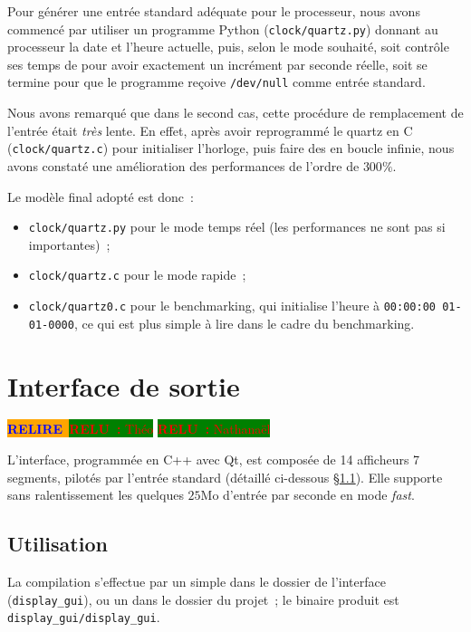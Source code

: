 \documentclass[11pt,a4paper]{article}
\newcommand{\relire}{\colorbox{orange}{\textcolor{blue}{\textbf{RELIRE}~}}}
\newcommand{\relu}[1]{\colorbox{green}{\textcolor{red}{\textbf{RELU~:} #1}}}
\begin{document}
Pour générer une entrée standard adéquate pour le processeur, nous avons commencé par utiliser un programme Python (\texttt{clock/quartz.py}) donnant au processeur la date et l'heure actuelle, puis, selon le mode souhaité, soit contrôle ses temps de  pour avoir exactement un incrément par seconde réelle, soit se termine pour que le programme reçoive \texttt{/dev/null} comme entrée standard.

Nous avons remarqué que dans le second cas, cette procédure de remplacement de l'entrée était \emph{très} lente. En effet, après avoir reprogrammé le quartz en C (\texttt{clock/quartz.c}) pour initialiser l'horloge, puis faire des  en boucle infinie, nous avons constaté une amélioration des performances de l'ordre de $300\%$.

Le modèle final adopté est donc~:
\begin{itemize}
\item \texttt{clock/quartz.py} pour le mode temps réel (les performances ne sont pas si importantes)~;
\item \texttt{clock/quartz.c} pour le mode rapide~;
\item \texttt{clock/quartz0.c} pour le benchmarking, qui initialise l'heure à \verb!00:00:00 01-01-0000!, ce qui est plus simple à lire dans le cadre du benchmarking.
\end{itemize}

\section{Interface de sortie} \label{sec:gui}

\relire \relu{Théo}
\relu{Nathanaël}

L'interface, programmée en C++ avec Qt, est composée de 14 afficheurs 7 segments, pilotés par l'entrée standard (détaillé ci-dessous §\ref{ssec:gui_use}). Elle supporte sans ralentissement les quelques $25\text{Mo}$ d'entrée par seconde en mode \emph{fast}.

\subsection{Utilisation} \label{ssec:gui_use}

La compilation s'effectue par un simple  dans le dossier de l'interface (\texttt{display\_gui}), ou un  dans le dossier du projet~; le binaire produit est \texttt{display\_gui/display\_gui}.
\end{document}
